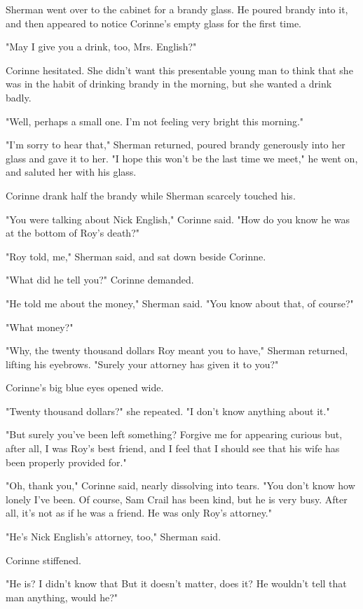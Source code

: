 \documentclass{novel}
\begin{document}
Sherman went over to the cabinet for a brandy glass. He poured brandy into it, and then appeared to notice Corinne's empty glass for the first time.

"May I give you a drink, too, Mrs. English?"

Corinne hesitated. She didn't want this presentable young man to think that she was in the habit of drinking brandy in the morning, but she wanted a drink badly.

"Well, perhaps a small one. I'm not feeling very bright this morning."

"I'm sorry to hear that," Sherman returned, poured brandy generously into her glass and gave it to her. "I hope this won't be the last time we meet," he went on, and saluted her with his glass.

Corinne drank half the brandy while Sherman scarcely touched his.

"You were talking about Nick English," Corinne said. "How do you know he was at the bottom of Roy's death?"

"Roy told, me," Sherman said, and sat down beside Corinne.

"What did he tell you?" Corinne demanded.

"He told me about the money," Sherman said. "You know about that, of course?"

"What money?"

"Why, the twenty thousand dollars Roy meant you to have," Sherman returned, lifting his eyebrows. "Surely your attorney has given it to you?"

Corinne's big blue eyes opened wide.

"Twenty thousand dollars?" she repeated. "I don't know anything about it."

"But surely you've been left something? Forgive me for appearing curious but, after all, I was Roy's best friend, and I feel that I should see that his wife has been properly provided for."

"Oh, thank you," Corinne said, nearly dissolving into tears. "You don't know how lonely I've been. Of course, Sam Crail has been kind, but he is very busy. After all, it's not as if he was a friend. He was only Roy's attorney."

"He's Nick English's attorney, too," Sherman said.

Corinne stiffened.

"He is? I didn't know that But it doesn't matter, does it? He wouldn't tell that man anything, would he?"
\end{document}
